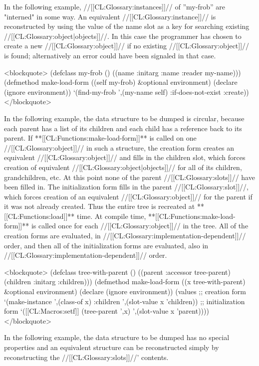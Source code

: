 \medbreak In the following example, //[[CL:Glossary:instances]]// of ''my-frob'' are "interned" in some way. An equivalent //[[CL:Glossary:instance]]// is reconstructed by using the value of the name slot as a key for searching existing //[[CL:Glossary:object|objects]]//. In this case the programmer has chosen to create a new //[[CL:Glossary:object]]// if no existing //[[CL:Glossary:object]]// is found; alternatively an error could have been signaled in that case.

\smallbreak <blockquote> (defclass my-frob () ((name :initarg :name :reader my-name))) (defmethod make-load-form ((self my-frob) &optional environment) (declare (ignore environment)) `(find-my-frob ',(my-name self) :if-does-not-exist :create)) </blockquote>

\medbreak In the following example, the data structure to be dumped is circular, because each parent has a list of its children and each child has a reference back to its parent. If **[[CL:Functions:make-load-form]]** is called on one //[[CL:Glossary:object]]// in such a structure, the creation form creates an equivalent //[[CL:Glossary:object]]// and fills in the children slot, which forces creation of equivalent //[[CL:Glossary:object|objects]]// for all of its children, grandchildren, etc. At this point none of the parent //[[CL:Glossary:slots]]// have been filled in. The initialization form fills in the parent //[[CL:Glossary:slot]]//, which forces creation of an equivalent //[[CL:Glossary:object]]// for the parent if it was not already created. Thus the entire tree is recreated at **[[CL:Functions:load]]** time. At compile time, **[[CL:Functions:make-load-form]]** is called once for each //[[CL:Glossary:object]]// in the tree. All of the creation forms are evaluated, in //[[CL:Glossary:implementation-dependent]]// order, and then all of the initialization forms are evaluated, also in //[[CL:Glossary:implementation-dependent]]// order.

\smallbreak <blockquote> (defclass tree-with-parent () ((parent :accessor tree-parent) (children :initarg :children))) (defmethod make-load-form ((x tree-with-parent) &optional environment) (declare (ignore environment)) (values ;; creation form `(make-instance ',(class-of x) :children ',(slot-value x 'children)) ;; initialization form `([[CL:Macros:setf]] (tree-parent ',x) ',(slot-value x 'parent)))) </blockquote>

\medbreak In the following example, the data structure to be dumped has no special properties and an equivalent structure can be reconstructed simply by reconstructing the //[[CL:Glossary:slots]]//' contents.

